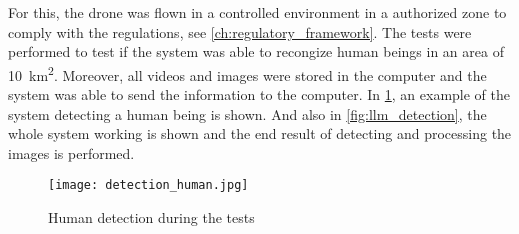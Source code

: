 For this, the drone was flown in a controlled environment in a authorized zone to comply with the regulations, see \cref{ch:regulatory_framework}. The tests were performed to test if the system was able to recongize human beings in an area of \SI{10}{\kilo\metre^2}. Moreover, all videos and images were stored in the computer and the system was able to send the information to the computer. In \cref{fig:detection_human}, an example of the system detecting a human being is shown. And also in \cref{fig:llm_detection}, the whole system working is shown and the end result of detecting and processing the images is performed.

\begin{figure}
	\texttt{[image: detection\_human.jpg]}
	\caption{Human detection during the tests}\label{fig:detection_human}
\end{figure}
